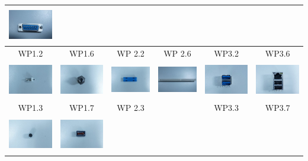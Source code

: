 \documentclass[journal]{IEEEtran}
\begin{document}
\begin{table}[!t]
\begin{center}
\begin{tabular}{|c|c||c|c||c|c|}
\includegraphics[width=1in,height=0.6in]{j_img/wp35.jpg} \\
\hline
WP1.2 & WP1.6 & WP 2.2 & WP 2.6 & WP3.2 & WP3.6\\
\hline
\includegraphics[width=1in,height=0.6in]{j_img/wp12.jpg} & 
\includegraphics[width=1in,height=0.6in]{j_img/wp16.jpg} & 
\includegraphics[width=1in,height=0.6in]{j_img/wp22.jpg} & 
\includegraphics[width=1in,height=0.6in]{j_img/wp26.jpg} &
\includegraphics[width=1in,height=0.6in]{j_img/wp32.jpg} & 
\includegraphics[width=1in,height=0.6in]{j_img/wp36.jpg} 
\\
\hline
WP1.3 & WP1.7 & WP 2.3 & & WP3.3 & WP3.7\\
\hline
\includegraphics[width=1in,height=0.6in]{j_img/wp13.jpg} & 
\includegraphics[width=1in,height=0.6in]{j_img/wp17.jpg} & 

\end{tabular}
\end{center}
\end{table}
\end{document}
